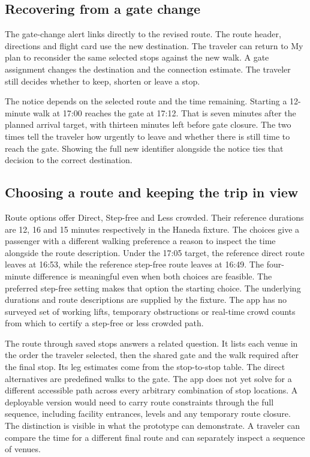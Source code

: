 \documentclass[sigconf,nonacm,balance=false]{acmart}
\begin{document}
\subsection{Recovering from a gate change}
The gate-change alert links directly to the revised route. The route header, directions and flight card use the new destination. The traveler can return to My plan to reconsider the same selected stops against the new walk. A gate assignment changes the destination and the connection estimate. The traveler still decides whether to keep, shorten or leave a stop.

The notice depends on the selected route and the time remaining. Starting a 12-minute walk at 17:00 reaches the gate at 17:12. That is seven minutes after the planned arrival target, with thirteen minutes left before gate closure. The two times tell the traveler how urgently to leave and whether there is still time to reach the gate. Showing the full new identifier alongside the notice ties that decision to the correct destination.

\subsection{Choosing a route and keeping the trip in view}
Route options offer Direct, Step-free and Less crowded. Their reference durations are 12, 16 and 15 minutes respectively in the Haneda fixture. The choices give a passenger with a different walking preference a reason to inspect the time alongside the route description. Under the 17:05 target, the reference direct route leaves at 16:53, while the reference step-free route leaves at 16:49. The four-minute difference is meaningful even when both choices are feasible. The preferred step-free setting makes that option the starting choice. The underlying durations and route descriptions are supplied by the fixture. The app has no surveyed set of working lifts, temporary obstructions or real-time crowd counts from which to certify a step-free or less crowded path.

The route through saved stops answers a related question. It lists each venue in the order the traveler selected, then the shared gate and the walk required after the final stop. Its leg estimates come from the stop-to-stop table. The direct alternatives are predefined walks to the gate. The app does not yet solve for a different accessible path across every arbitrary combination of stop locations. A deployable version would need to carry route constraints through the full sequence, including facility entrances, levels and any temporary route closure. The distinction is visible in what the prototype can demonstrate. A traveler can compare the time for a different final route and can separately inspect a sequence of venues.
\end{document}
